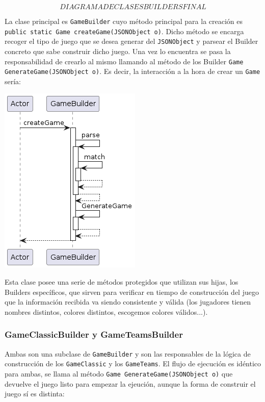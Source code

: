 \documentclass[12pt,a4paper,openright]{book}
\theoremstyle{break}
\begin{document}
$$DIAGRAMA DE CLASES BUILDERS FINAL$$

La clase principal es \texttt{GameBuilder} cuyo método principal para la creación es \texttt{public static Game createGame(JSONObject o)}. Dicho método se encarga recoger el tipo de juego que se desea generar del \texttt{JSONObject} y parsear el Builder concreto que sabe construir dicho juego. Una vez lo encuentra se pasa la responsabilidad de crearlo al mismo llamando al método de los Builder \texttt{Game GenerateGame(JSONObject o)}. Es decir, la interacción a la hora de crear un \texttt{Game} sería:
\begin{center}
\includegraphics[scale=0.55]{Builders_final_seq}
\end{center}

Esta clase posee una serie de métodos protegidos que utilizan sus hijas, los Builders específicos, que sirven para verificar en tiempo de construcción del juego que la información recibida va siendo consistente y válida (los jugadores tienen nombres distintos, colores distintos, escogemos colores válidos...).

\subsubsection{GameClassicBuilder y GameTeamsBuilder}
Ambas son una subclase de \texttt{GameBuilder} y son las responsables de la lógica de construcción de los \texttt{GameClassic} y los \texttt{GameTeams}. El flujo de ejecución es idéntico para ambas, se llama al método \texttt{Game GenerateGame(JSONObject o)} que devuelve el juego listo para empezar la ejeución, aunque la forma de construir el juego sí es distinta:
\end{document}
